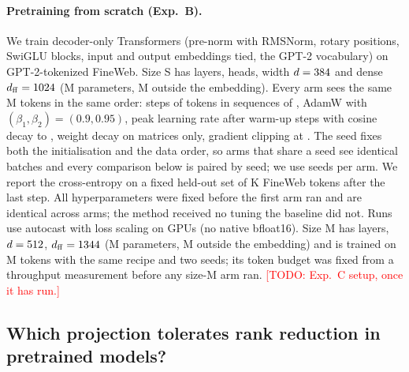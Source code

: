 \documentclass{article}
\newcommand{\todo}[1]{\textcolor{red}{[TODO: #1]}}
\begin{document}
\paragraph{Pretraining from scratch (Exp.~B).} We train decoder-only Transformers (pre-norm with RMSNorm,
rotary positions, SwiGLU blocks, input and output embeddings tied, the GPT-2 vocabulary) on
GPT-2-tokenized FineWeb. %
Size S has \nLayerS{} layers, \nHeadS{} heads, width $d = 384$ and dense
$d_{\mathrm{ff}} = 1024$ (\denseTotalM{}M parameters, \denseNonEmbedM{}M outside the embedding). Every arm
sees the same \trainTokensM{}M tokens in the same order: \trainSteps{} steps of \batchTokens{} tokens in
sequences of \seqLen{}, AdamW with $(\beta_1, \beta_2) = (0.9, 0.95)$, peak learning rate \lrPeak{} after
\warmupSteps{} warm-up steps with cosine decay to \lrFloor{}, weight decay \weightDecay{} on matrices only,
gradient clipping at \gradClip{}. The seed fixes both the initialisation and the data order, so arms that share
a seed see identical batches and every comparison below is paired by seed; we use \nSeeds{} seeds per arm.
We report the cross-entropy on a fixed held-out set of \evalTokensK{}K FineWeb tokens after the last step.
All hyperparameters were fixed before the first arm ran and are identical across arms; the method received
no tuning the baseline did not. Runs use \ampDtype{} autocast with loss scaling on \gpuName{} GPUs (no
native bfloat16). Size M has \nLayerM{} layers, $d = 512$, $d_{\mathrm{ff}} = 1344$ (\denseTotalMM{}M parameters,
\denseNonEmbedMM{}M outside the embedding) and is trained on \trainTokensMM{}M tokens with the same recipe and
two seeds; its token budget was fixed from a throughput measurement before any size-M arm ran.
\todo{Exp.~C setup, once it has run.}

\subsection{Which projection tolerates rank reduction in pretrained models?}
\label{sec:expa}
\label{sec:exp_a}
\end{document}
